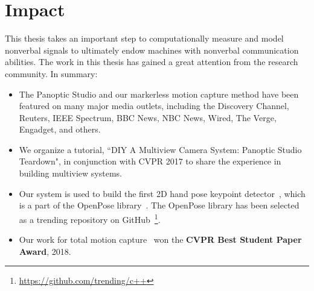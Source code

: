 







\section{Impact}

This thesis takes an important step to computationally measure and model nonverbal signals to ultimately endow machines with nonverbal communication abilities. The work in this thesis has gained a great attention from the research community. In summary:

\begin{itemize}
	\item The Panoptic Studio and our markerless motion capture method have been featured on many major media outlets, including the Discovery Channel, Reuters, IEEE Spectrum, BBC News, NBC News, Wired, The Verge, Engadget, and others.
	
	\item We organize a tutorial, ``DIY A Multiview Camera System: Panoptic Studio Teardown", in conjunction with CVPR 2017 to share the experience in building multiview systems.  
	
	\item Our system is used to build the first 2D hand pose keypoint detector~\cite{simon2017hand}, which is a part of the OpenPose library~\cite{openpose}. The OpenPose library has been selected as a trending repository on GitHub~\footnote{\url{https://github.com/trending/c++}}.
	
	
	\item Our work for total motion capture~\cite{joo2018} won the \textbf{CVPR Best Student Paper Award}, 2018.
\end{itemize}

